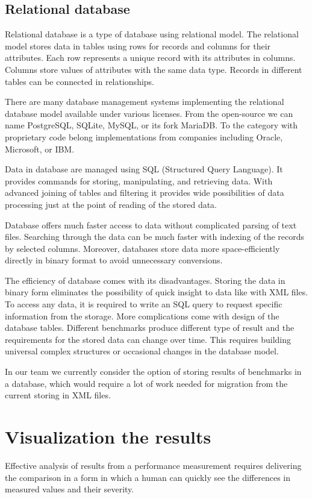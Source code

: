 \subsection{Relational database}
Relational database is a type of database using relational model. The relational
model stores data in tables using rows for records and columns for their
attributes. Each row represents a unique record with its attributes in columns.
Columns store values of attributes with the same data type. Records in different
tables can be connected in relationships.

There are many database management systems implementing the relational database
model available under various licenses. From the open-source we can name
PostgreSQL, SQLite, MySQL, or its fork MariaDB. To the category with proprietary
code belong implementations from companies including Oracle, Microsoft, or IBM.

Data in database are managed using SQL (Structured Query Language). It provides
commands for storing, manipulating, and retrieving data. With advanced joining of
tables and filtering it provides wide possibilities of data processing just at
the point of reading of the stored data.

Database offers much faster access to data without complicated parsing of text
files. Searching through the data can be much faster with indexing of the
records by selected columns. Moreover, databases store data more
space-efficiently directly in binary format to avoid unnecessary conversions.

The efficiency of database comes with its disadvantages. 
Storing the data in binary form eliminates the possibility of quick insight to
data like with XML files. To access any data, it is required to write an SQL query to
request specific information from the storage.
More complications come with design of the database tables. Different benchmarks
produce different type of result and the requirements for the stored data can change
over time. This requires building universal complex structures or occasional
changes in the database model.

In our team we currently consider the option of storing results of benchmarks in
a database, which would require a lot of work needed for migration from the
current storing in XML files.

\section{Visualization the results} \label{sec:visualization}
Effective analysis of results from a performance measurement requires delivering
the comparison in a form in which a human can quickly see the differences in
measured values and their severity.

